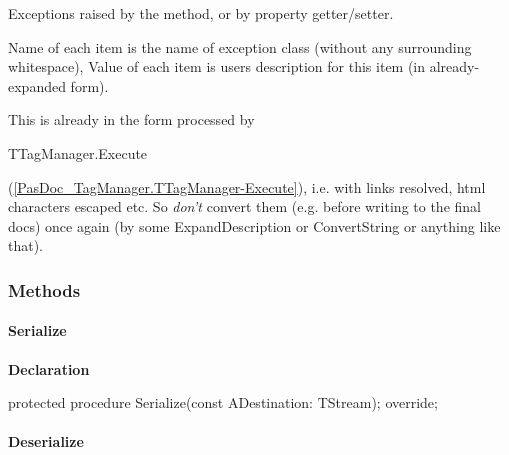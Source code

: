 \documentclass{report}
\newif\ifpdf
\begin{document}
\begin{list}{}
\par Exceptions raised by the method, or by property getter/setter.

Name of each item is the name of exception class (without any surrounding whitespace), Value of each item is users description for this item (in already{-}expanded form).

This is already in the form processed by \begin{ttfamily}TTagManager.Execute\end{ttfamily}(\ref{PasDoc_TagManager.TTagManager-Execute}), i.e. with links resolved, html characters escaped etc. So \textit{don't} convert them (e.g. before writing to the final docs) once again (by some ExpandDescription or ConvertString or anything like that).\end{list}
\subsubsection*{\large{\textbf{Methods}}\normalsize\hspace{1ex}\hfill}
\paragraph*{Serialize}\hspace*{\fill}

\label{PasDoc_Items.TPasItem-Serialize}
\begin{list}{}{
\setlength{\itemindent}{0cm}
\setlength{\listparindent}{0cm}
\setlength{\leftmargin}{\evensidemargin}
\addtolength{\leftmargin}{\tmplength}
\settowidth{\labelsep}{X}
\addtolength{\leftmargin}{\labelsep}
\setlength{\labelwidth}{\tmplength}
}
\item[\textbf{Declaration}\hfill]
\ifpdf
\begin{flushleft}
\fi
\begin{ttfamily}
protected procedure Serialize(const ADestination: TStream); override;\end{ttfamily}

\ifpdf
\end{flushleft}
\fi

\end{list}
\paragraph*{Deserialize}\hspace*{\fill}
\end{document}
